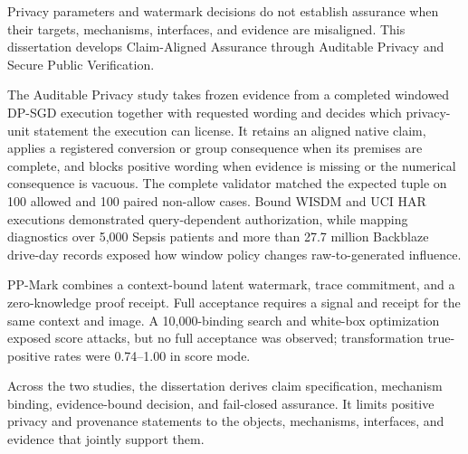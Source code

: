 Privacy parameters and watermark decisions do not establish assurance when their
targets, mechanisms, interfaces, and evidence are misaligned.  This dissertation
develops Claim-Aligned Assurance through Auditable Privacy and Secure Public
Verification.

The Auditable Privacy study takes frozen evidence from a completed windowed
DP-SGD execution together with requested wording and decides which privacy-unit
statement the execution can license.  It retains an aligned native claim, applies
a registered conversion or group consequence when its premises are complete, and
blocks positive wording when evidence is missing or the numerical consequence is
vacuous.  The complete validator matched the expected tuple on 100 allowed and
100 paired non-allow cases.  Bound WISDM and UCI HAR executions demonstrated
query-dependent authorization, while mapping diagnostics over 5,000 Sepsis
patients and more than 27.7 million Backblaze drive-day records exposed how window
policy changes raw-to-generated influence. 

PP-Mark combines a context-bound latent watermark, trace commitment, and a
zero-knowledge proof receipt.  Full acceptance requires a signal and receipt for
the same context and image.  A 10,000-binding search and white-box optimization
exposed score attacks, but no full acceptance was observed; transformation
true-positive rates were 0.74--1.00 in score mode.

Across the two studies, the dissertation derives claim specification, mechanism
binding, evidence-bound decision, and fail-closed assurance.  It limits positive
privacy and provenance statements to the objects, mechanisms, interfaces, and
evidence that jointly support them.
